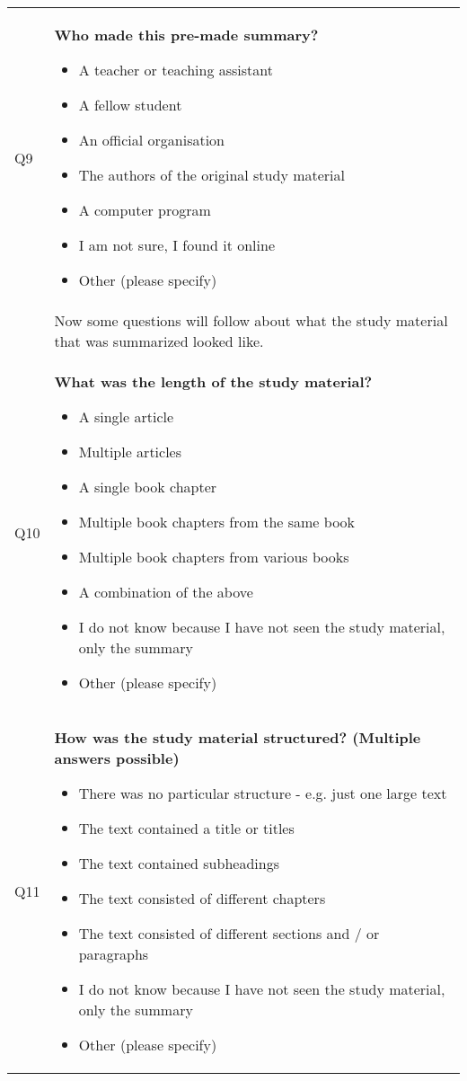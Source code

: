 \begin{xtabular}{@{\,}l <{\hskip 2pt} >{\raggedright\arraybackslash}p{0.82\textwidth}}
        Q9 & \textbf{Who made this pre-made summary?}
        \begin{itemize}[label=$\square$, leftmargin=*, nosep]
          \item A teacher or teaching assistant
          \item A fellow student
          \item An official organisation
          \item The authors of the original study material
          \item A computer program
          \item I am not sure, I found it online
          \item Other (please specify)
        \end{itemize}

        \\

        & Now some questions will follow about what the study material that was summarized looked like. \\

        Q10 & \textbf{What was the length of the study material?}
        \begin{itemize}[label=$\square$, leftmargin=*, nosep]
          \item A single article
          \item Multiple articles
          \item A single book chapter
          \item Multiple book chapters from the same book
          \item Multiple book chapters from various books
          \item A combination of the above
          \item I do not know because I have not seen the study material, only the summary
          \item Other (please specify)
        \end{itemize}

        \\

        Q11 & \textbf{How was the study material structured? (Multiple answers possible)}
        \begin{itemize}[label=$\square$, leftmargin=*, nosep]
          \item There was no particular structure - e.g. just one large text
          \item The text contained a title or titles
          \item The text contained subheadings
          \item The text consisted of different chapters
          \item The text consisted of different sections and / or paragraphs
          \item I do not know because I have not seen the study material, only the summary
          \item Other (please specify)
        \end{itemize}


\end{xtabular}
